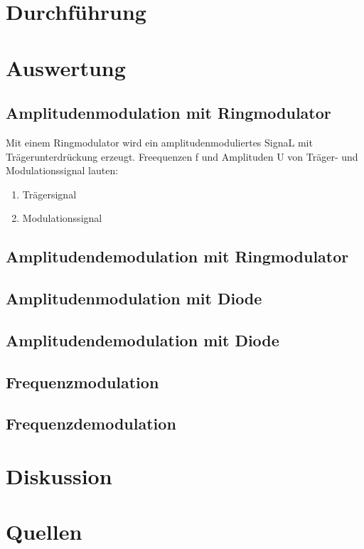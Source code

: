 \documentclass[]{scrartcl}
\begin{document}
\section{Durchführung}

\section{Auswertung}

\subsection{Amplitudenmodulation mit Ringmodulator}
Mit einem Ringmodulator wird ein amplitudenmoduliertes SignaL mit Trägerunterdrückung erzeugt. Freequenzen f und Amplituden U von Träger- und Modulationssignal lauten:
\begin{enumerate}
	\item Trägersignal
	\item Modulationssignal 
\end{enumerate}
\subsection{Amplitudendemodulation mit Ringmodulator}

\subsection{Amplitudenmodulation mit Diode}

\subsection{Amplitudendemodulation mit Diode}

\subsection{Frequenzmodulation}

\subsection{Frequenzdemodulation}

\section{Diskussion}

\section{Quellen}
\end{document}
